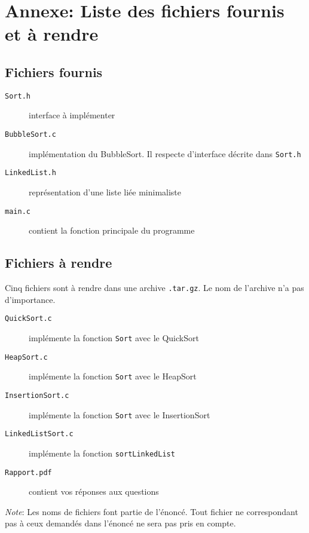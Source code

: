 \documentclass[a4paper,10pt]{article}
\begin{document}
\section*{Annexe: Liste des fichiers fournis et à rendre}

\subsection*{Fichiers fournis}
\begin{description}
\item[\texttt{Sort.h}] interface à implémenter
\item[\texttt{BubbleSort.c}] implémentation du BubbleSort. Il respecte d'interface décrite dans \texttt{Sort.h}
\item[\texttt{LinkedList.h}] représentation d'une liste liée minimaliste
\item[\texttt{main.c}] contient la fonction principale du programme
\end{description}
\subsection*{Fichiers à rendre}
Cinq fichiers sont à rendre dans une archive \texttt{.tar.gz}. Le nom de l'archive n'a pas d'importance.
\begin{description}
\item[\texttt{QuickSort.c}] implémente la fonction \texttt{Sort} avec le QuickSort
\item[\texttt{HeapSort.c}] implémente la fonction \texttt{Sort} avec le HeapSort
\item[\texttt{InsertionSort.c}] implémente la fonction \texttt{Sort} avec le InsertionSort
\item[\texttt{LinkedListSort.c}] implémente la fonction \texttt{sortLinkedList}
\item[\texttt{Rapport.pdf}] contient vos réponses aux questions
\end{description}

{\em Note}: Les noms de fichiers font partie de l'énoncé. Tout fichier ne
correspondant pas à ceux demandés dans l'énoncé ne sera pas pris en compte.
\end{document}
